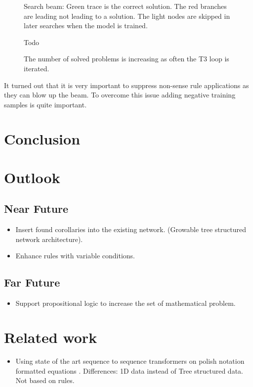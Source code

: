 \documentclass{scrartcl}
\theoremstyle{definition}
\begin{document}
\begin{figure}[!htbp]
	\centering
	
	\caption{Search beam: Green trace is the correct solution. The red branches are leading not leading to a solution. The light nodes are skipped in later searches when the model is trained.}
\end{figure}

\begin{figure}[!htbp]
	\centering
	Todo
	\caption{The number of solved problems is increasing as often the T3 loop is iterated.}
\end{figure}

It turned out that it is very important to suppress non-sense rule applications as they can blow up the beam.
To overcome this issue adding negative training samples is quite important.

\section{Conclusion}

\section{Outlook}
\subsection{Near Future}
\begin{itemize}
	\item Insert found corollaries into the existing network. (Growable tree structured network architecture). \cite{graves2016hybrid}
	\item Enhance rules with variable conditions.
\end{itemize}

\subsection{Far Future}
\begin{itemize}
	\item Support propositional logic to increase the set of mathematical problem.
\end{itemize}

\section{Related work}

\begin{itemize}
	\item Using state of the art sequence to sequence transformers on polish notation formatted equations \cite{Lample2020Deep}. Differences: 1D data instead of Tree structured data. Not based on rules. 
\end{itemize}

\printbibliography
\end{document}
